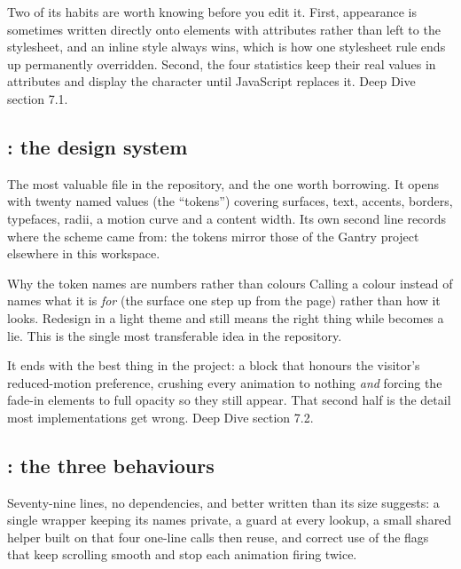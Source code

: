 \documentclass[11pt,a4paper]{article}
\begin{document}
Two of its habits are worth knowing before you edit it. First, appearance is
sometimes written directly onto elements with  attributes rather than
left to the stylesheet, and an inline style always wins, which is how one
stylesheet rule ends up permanently overridden. Second, the four statistics keep
their real values in  attributes and display the character 
until JavaScript replaces it. Deep Dive section 7.1.

\subsection{: the design system}

The most valuable file in the repository, and the one worth borrowing. It opens
with twenty named values (the ``tokens'') covering surfaces, text, accents,
borders, typefaces, radii, a motion curve and a content width. Its own second line
records where the scheme came from: the tokens mirror those of the Gantry project
elsewhere in this workspace.

\begin{keyidea}{Why the token names are numbers rather than colours}
Calling a colour  instead of  names what it is
\emph{for} (the surface one step up from the page) rather than how it looks.
Redesign in a light theme and  still means the right thing while
 becomes a lie. This is the single most transferable idea in the
repository.
\end{keyidea}

It ends with the best thing in the project: a block that honours the visitor's
reduced-motion preference, crushing every animation to nothing \emph{and} forcing
the fade-in elements to full opacity so they still appear. That second half is the
detail most implementations get wrong. Deep Dive section 7.2.

\subsection{: the three behaviours}

Seventy-nine lines, no dependencies, and better written than its size suggests: a
single wrapper keeping its names private, a guard at every lookup, a small shared
helper built on  that four one-line calls then reuse,
and correct use of the flags that keep scrolling smooth and stop each animation
firing twice.
\end{document}
